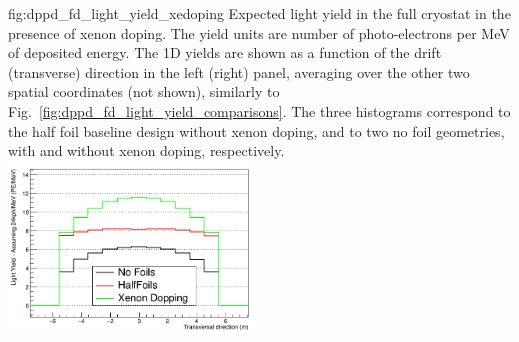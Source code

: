 \begin{dunefigure}{fig:dppd_fd_light_yield_xedoping}
{Expected light yield in the full   cryostat in the presence of xenon doping. The yield units are number of photo-electrons per \si{\MeV} of deposited energy. The 1D yields are shown as a function of the drift (transverse) direction in the left (right) panel, averaging over the other two spatial coordinates (not shown), similarly to Fig.~\ref{fig:dppd_fd_light_yield_comparisons}. The three histograms correspond to the half foil baseline design without xenon doping, and to two no foil geometries, with and without xenon doping, respectively.}
 \hfill
\includegraphics[width=0.49\textwidth]{graphics/dppd_xedoping_transverse.png}
\end{dunefigure}